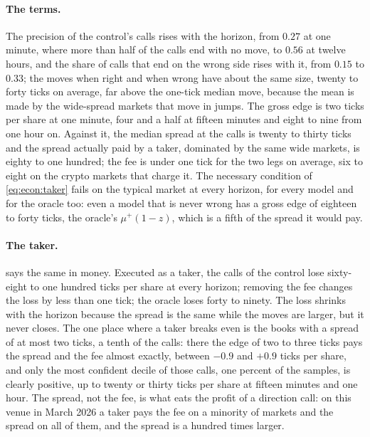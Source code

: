 \paragraph{The terms.}  The precision of the control's calls rises with the horizon, from
$0.27$ at one minute, where more than half of the calls end with no move, to $0.56$ at
twelve hours, and the share of calls that end on the wrong side rises with it, from $0.15$
to $0.33$; the moves when right and when wrong have about the same size, twenty to forty
ticks on average, far above the one-tick median move, because the mean is made by the
wide-spread markets that move in jumps.  The gross edge is two ticks per share at one minute,
four and a half at fifteen minutes and eight to nine from one hour on.  Against it, the
median spread at the calls is twenty to thirty ticks and the spread actually paid by a
taker, dominated by the same wide markets, is eighty to one hundred; the fee is under one
tick for the two legs on average, six to eight on the crypto markets that charge it.  The
necessary condition of \cref{eq:econ:taker} fails on the typical market at every horizon, for
every model and for the oracle too: even a model that is never wrong has a gross edge of
eighteen to forty ticks, the oracle's $\mu^{+}(1 - z)$, which is a fifth of the spread it
would pay.

\paragraph{The taker.}   says the same in money.  Executed as a taker, the
calls of the control lose sixty-eight to one hundred ticks per share at every horizon; removing
the fee changes the loss by less than one tick; the oracle loses forty to ninety.  The loss
shrinks with the horizon because the spread is the same while the moves are larger, but it
never closes.  The one place where a taker breaks even is the books with a spread of at most
two ticks, a tenth of the calls: there the edge of two to three ticks pays the spread and the
fee almost exactly, between $-0.9$ and $+0.9$ ticks per share, and only the most confident
decile of those calls, one percent of the samples, is clearly positive, up to twenty or
thirty ticks per share at fifteen minutes and one hour.  The spread, not the fee, is what
eats the profit of a direction call: on this venue in March 2026 a taker pays the fee on a minority of markets
and the spread on all of them, and the spread is a hundred times larger.

